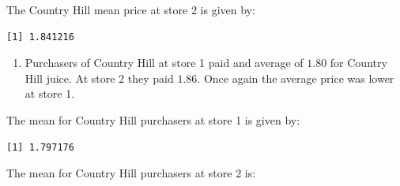 \documentclass[
  letterpaper,
  DIV=11,
  numbers=noendperiod]{scrreprt}
\newenvironment{Shaded}{\begin{snugshade}}{\end{snugshade}}
\newcommand{\DecValTok}[1]{\textcolor[rgb]{0.68,0.00,0.00}{#1}}
\newcommand{\FunctionTok}[1]{\textcolor[rgb]{0.28,0.35,0.67}{#1}}
\newcommand{\NormalTok}[1]{\textcolor[rgb]{0.00,0.23,0.31}{#1}}
\newcommand{\SpecialCharTok}[1]{\textcolor[rgb]{0.37,0.37,0.37}{#1}}
\newcommand{\StringTok}[1]{\textcolor[rgb]{0.13,0.47,0.30}{#1}}
\providecommand{\tightlist}{%
  \setlength{\itemsep}{0pt}\setlength{\parskip}{0pt}}\usepackage{longtable,booktabs,array}
\begin{document}
The Country Hill mean price at store 2 is given by:

\begin{Shaded}
\end{Shaded}

\begin{verbatim}
[1] 1.841216
\end{verbatim}

\begin{enumerate}
\def\labelenumi{\arabic{enumi}.}
\setcounter{enumi}{2}
\tightlist
\item
  Purchasers of Country Hill at store 1 paid and average of \(1.80\) for
  Country Hill juice. At store 2 they paid \(1.86\). Once again the
  average price was lower at store 1.
\end{enumerate}

The mean for Country Hill purchasers at store 1 is given by:

\begin{Shaded}
\end{Shaded}

\begin{verbatim}
[1] 1.797176
\end{verbatim}

The mean for Country Hill purchasers at store 2 is:

\begin{Shaded}
\end{Shaded}
\end{document}
